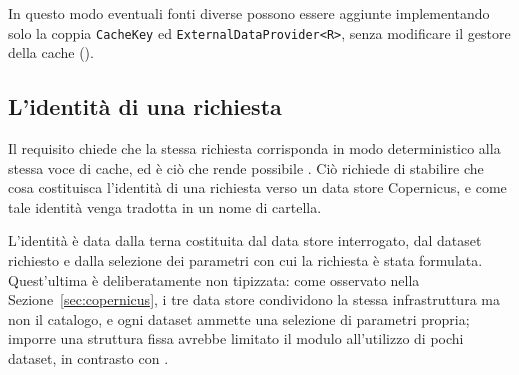 In questo modo eventuali fonti diverse possono essere aggiunte
implementando solo la coppia \texttt{CacheKey} ed \texttt{ExternalDataProvider<R>},
senza modificare il gestore della cache ().

\subsection{L'identità di una richiesta}
\label{subsec:acquisizione-identita}

Il requisito  chiede che la stessa richiesta corrisponda in modo deterministico
alla stessa voce di cache, ed è ciò che rende possibile . Ciò richiede di
stabilire che cosa costituisca l'identità di una richiesta verso un data store Copernicus,
e come tale identità venga tradotta in un nome di cartella.

L'identità è data dalla terna costituita dal data store interrogato, dal dataset richiesto
e dalla selezione dei parametri con cui la richiesta è stata formulata. Quest'ultima è
deliberatamente non tipizzata: come osservato nella Sezione~\ref{sec:copernicus}, i tre
data store condividono la stessa infrastruttura ma non il catalogo, e ogni dataset ammette
una selezione di parametri propria; imporre una struttura fissa avrebbe limitato
il modulo all'utilizzo di pochi dataset, in contrasto con .

